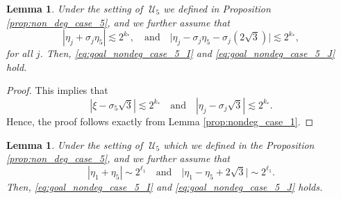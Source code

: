 \documentclass[reqno,english,11pt]{amsart}
\newtheorem{lemma}[theorem]{Lemma}
\theoremstyle{definition}
\numberwithin{equation}{section}
\begin{document}
\begin{lemma}\label{lem:nondeg_case_5_subcase_1}
    Under the setting of $\;\mathcal{U}_5$ we defined in Proposition \ref{prop:non_deg_case_5}, and we further assume that
    $$\left|\eta_j+\sigma_j\eta_5\right|\lesssim 2^{k_*},\quad \text{and}\quad \big|\eta_j-\sigma_j\eta_5-\sigma_j(2\sqrt3)\big|\lesssim 2^{k_*}, $$
     for all $j$. Then, \eqref{eq:goal_nondeg_case_5_I} and \eqref{eq:goal_nondeg_case_5_J} hold.
\end{lemma}
\begin{proof}
This implies that 
     $$|\xi-\sigma_5\sqrt{3}|\lesssim 2^{k_*}\quad\text{and}\quad |\eta_j-\sigma_j\sqrt{3}|\lesssim 2^{k_*}.$$
     Hence, the proof follows exactly from  Lemma \ref{prop:nondeg_case_1}.
\end{proof}
\begin{lemma}\label{lem:nondeg_case_5_subcase_2}
    Under the setting of $\;\mathcal{U}_5$ which we defined in the Proposition \ref{prop:non_deg_case_5}, and we further assume that
	$$|\eta_1+\eta_5|\sim 2^{\ell_1}\quad\text{and}\quad \big|\eta_1-\eta_5+2\sqrt{3}\big|\sim 2^{\ell_1}.$$
    Then, \eqref{eq:goal_nondeg_case_5_I} and \eqref{eq:goal_nondeg_case_5_J} holds.
\end{lemma}
\end{document}
